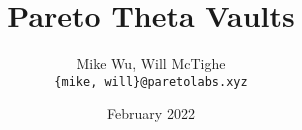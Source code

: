 \documentclass[hidelinks, 12pt]{article}
\title{Pareto Theta Vaults}
\author{Mike Wu, Will McTighe \\ \small\texttt{\{mike, will\}@paretolabs.xyz}}
\date{February 2022}
\begin{document}
\maketitle

\begin{abstract}
\end{abstract}



\end{document}
